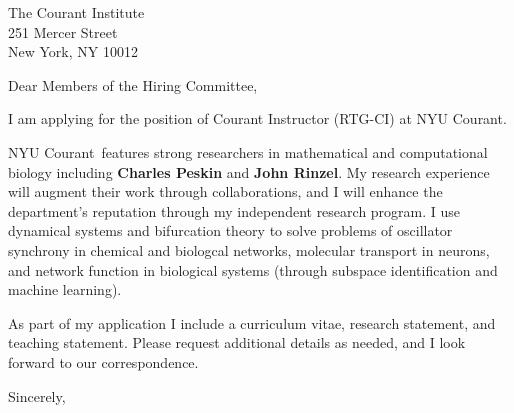\documentclass[11pt,a4paper]{letter}
\begin{document}
\def\School{NYU Courant}
\begin{letter}
{The Courant Institute\\
251 Mercer Street\\
New York, NY 10012}


\opening{Dear Members of the Hiring Committee,}

I am applying for the position of Courant Instructor (RTG-CI) at \School. 



\School~features strong researchers in mathematical and computational biology including \textbf{Charles Peskin} and \textbf{John Rinzel}. My research experience will augment their work through collaborations, and I will enhance the department's reputation through my independent research program. I use dynamical systems and bifurcation theory to solve problems of oscillator synchrony in chemical and biologcal networks, molecular transport in neurons, and network function in biological systems (through subspace identification and machine learning).



As part of my application I include a curriculum vitae, research statement, and teaching statement. Please request additional details as needed, and I look forward to our correspondence.

\closing{Sincerely,}
\end{letter}
\end{document}
